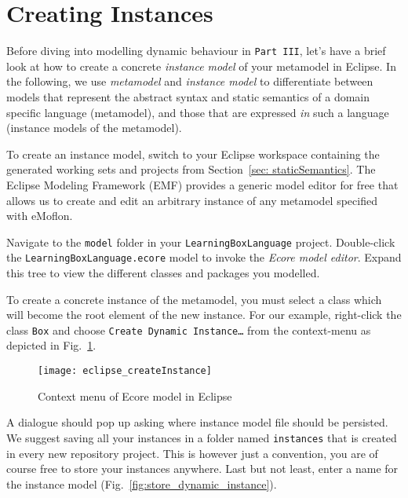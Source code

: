 \newpage
\genHeader

\section{Creating Instances}

\hypertarget{creatingInstance common}{}Before diving into modelling dynamic behaviour in \texttt{Part III}, let's have a brief look at how to create a concrete \emph{instance model} of your metamodel in Eclipse.
In the following, we use \emph{metamodel} and \emph{instance model} to differentiate between models that represent the abstract syntax and static semantics of a domain specific language (metamodel), and those that are expressed \emph{in} such a language (instance models of the metamodel).

To create an instance model, switch to your Eclipse workspace containing the generated working sets and projects from Section~\ref{sec: staticSemantics}. The Eclipse Modeling Framework (EMF) provides a generic model editor for free that allows us to create and edit an arbitrary instance of any metamodel specified with eMoflon.

Navigate to the \texttt{model} folder in your \texttt{LearningBoxLanguage} project.
Double-click the \texttt{LearningBoxLanguage.ecore} model to invoke  the \emph{Ecore model editor}.
Expand this tree to view the different classes and packages you modelled. %

To create a concrete instance of the metamodel, you must select a class which will become the root element of the new instance.
For our example, right-click the class \texttt{Box} and choose \texttt{Create Dynamic Instance\ldots} from the context-menu as depicted in Fig.~\ref{fig:context_menu}.

\begin{figure}[htbp]
	\centering
  \texttt{[image: eclipse\_createInstance]}
	\caption{Context menu of Ecore model in Eclipse}
	\label{fig:context_menu}
\end{figure}


A dialogue should pop up asking where instance model file should be persisted.
We suggest saving all your instances in a folder named \texttt{instances} that is created in every new repository project.
This is however just a convention, you are of course free to store your instances anywhere.
Last but not least, enter a name for the instance model (Fig.~\ref{fig:store_dynamic_instance}).

